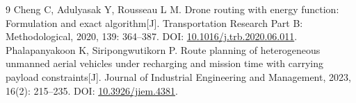 \documentclass[a4paper,11pt]{article}
\begin{document}
\begin{thebibliography}{9}
 Cheng C, Adulyasak Y, Rousseau L M. Drone routing with energy function: Formulation and exact algorithm[J]. Transportation Research Part B: Methodological, 2020, 139: 364--387. DOI: \href{https://doi.org/10.1016/j.trb.2020.06.011}{10.1016/j.trb.2020.06.011}.
 Phalapanyakoon K, Siripongwutikorn P. Route planning of heterogeneous unmanned aerial vehicles under recharging and mission time with carrying payload constraints[J]. Journal of Industrial Engineering and Management, 2023, 16(2): 215--235. DOI: \href{https://doi.org/10.3926/jiem.4381}{10.3926/jiem.4381}.
\end{thebibliography}
\end{document}
